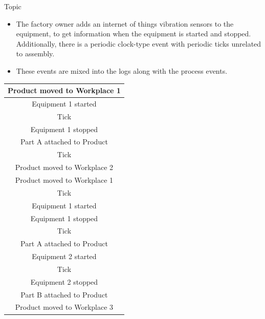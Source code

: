 \documentclass[final,xcolor={usenames,x11names}]{beamer}
\newlength{\onecolwid}
\begin{document}
\begin{frame}[t]
\begin{columns}[t]
\begin{column}{\onecolwid}
\begin{alertblock}{Topic}
\begin{itemize}
\item The factory owner adds an internet of things vibration sensors to the equipment, to get information when the equipment is started and stopped.
Additionally, there is a periodic clock-type event with periodic ticks unrelated to assembly.
\item These events are mixed into the logs along with the process events.
\end{itemize}

\begin{center}
{
\ttfamily
\begin{tabular}{|c|}
  \hline
  \cellcolor{PaleTurquoise1}
Product moved to Workplace 1
  \\
  \hline
  \cellcolor{PaleTurquoise1>wheel,2,5}
Equipment 1 started
  \\
  \hline
  \cellcolor{PaleTurquoise1>wheel,4,5}
Tick
  \\
  \hline
  \cellcolor{PaleTurquoise1>wheel,2,5}
Equipment 1 stopped
  \\
  \hline
  \cellcolor{PaleTurquoise1}
Part A attached to Product
  \\
  \hline
  \cellcolor{PaleTurquoise1>wheel,4,5}
Tick
  \\
  \hline
  \cellcolor{PaleTurquoise1}
Product moved to Workplace 2
  \\
  \hline
  \cellcolor{PaleTurquoise1>wheel,1,5}
Product moved to Workplace 1
  \\
  \hline
  \cellcolor{PaleTurquoise1>wheel,4,5}
Tick
  \\
  \hline
  \cellcolor{PaleTurquoise1>wheel,2,5}
Equipment 1 started
  \\
  \hline
  \cellcolor{PaleTurquoise1>wheel,2,5}
Equipment 1 stopped
  \\
  \hline
  \cellcolor{PaleTurquoise1>wheel,4,5}
Tick
  \\
  \hline
  \cellcolor{PaleTurquoise1>wheel,1,5}
Part A attached to Product
  \\
  \hline
  \cellcolor{PaleTurquoise1>wheel,2,5}
Equipment 2 started
  \\
  \hline
  \cellcolor{PaleTurquoise1>wheel,4,5}
Tick
  \\
  \hline
  \cellcolor{PaleTurquoise1>wheel,2,5}
Equipment 2 stopped
  \\
  \hline
  \cellcolor{PaleTurquoise1}
Part B attached to Product
  \\
  \hline
  \cellcolor{PaleTurquoise1}
Product moved to Workplace 3
  \\

\end{tabular}}
\end{center}
\end{alertblock}
\end{column}
\end{columns}
\end{frame}
\end{document}
